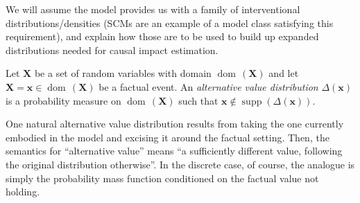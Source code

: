 \documentclass[anon,12pt]{clear2026} %
\newcommand{\dom}{\operatorname{dom}\,}
\begin{document}

We will assume the model provides us with a family of interventional distributions/densities (SCMs are an example of a model class satisfying this requirement), and explain how those are to be used to build up expanded distributions needed for causal impact estimation.


\begin{definition}
Let $\mathbf{X}$ be a set of random variables with domain $\dom(\mathbf{X})$ and
let $\mathbf{X}=\mathbf{x}\in\dom(\mathbf{X})$ be a factual event.
An \emph{alternative value distribution} $\Delta(\mathbf{x})$ is a probability
measure on $\dom(\mathbf{X})$ such that $\mathbf{x} \notin \operatorname{supp}(\Delta(\mathbf{x}))$.
\end{definition}




\noindent One natural alternative value distribution results from taking the one currently embodied in the model and excising it around the factual setting. Then, the semantics for  ``alternative value'' means ``a sufficiently different value, following the original distribution otherwise''. In the discrete case, of course, the analogue is simply the probability mass function conditioned on the factual value not holding.

\end{document}
